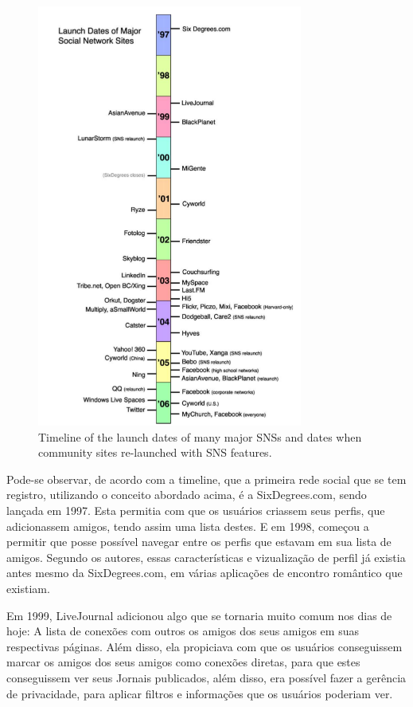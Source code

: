 \begin{figure}[h]
    \centering
    \includegraphics[width=330px, scale=1]{figuras/historicosns}
    \caption{Timeline of the launch dates of many major SNSs and dates when community sites
re-launched with SNS features. }
    \label{fig:historicosns}
\end{figure}

Pode-se observar, de acordo com a timeline, que a primeira rede social que se tem
registro, utilizando o conceito abordado acima, é a SixDegrees.com, sendo lançada
em 1997. Esta permitia com que os usuários criassem seus perfis, que adicionassem
amigos, tendo assim uma lista destes. E em 1998, começou a permitir que posse possível
navegar entre os perfis que estavam em sua lista de amigos. Segundo os autores,
essas características e vizualização de perfil já existia antes mesmo da SixDegrees.com,
em várias aplicações de encontro romântico que existiam.

Em 1999, LiveJournal adicionou algo que se tornaria muito comum nos dias de hoje:
A lista de conexões com outros os amigos dos seus amigos em suas respectivas páginas.
Além disso, ela propiciava com que os usuários conseguissem marcar os amigos
dos seus amigos como conexões diretas, para que estes conseguissem ver seus Jornais
publicados, além disso, era possível fazer a gerência de privacidade, para
aplicar filtros e informações que os usuários poderiam ver.

